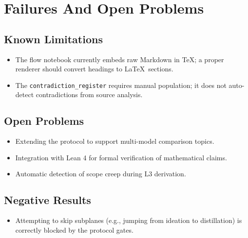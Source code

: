 \documentclass[11pt,a4paper]{article}
\begin{document}
\section{Failures And Open Problems}

\subsection{Known Limitations}
\begin{itemize}
  \item The flow notebook currently embeds raw Markdown in TeX; a
        proper renderer should convert headings to \LaTeX\ sections.
  \item The \texttt{contradiction\_register} requires manual population;
        it does not auto-detect contradictions from source analysis.
\end{itemize}

\subsection{Open Problems}
\begin{itemize}
  \item Extending the protocol to support multi-model comparison topics.
  \item Integration with Lean 4 for formal verification of mathematical claims.
  \item Automatic detection of scope creep during L3 derivation.
\end{itemize}

\subsection{Negative Results}
\begin{itemize}
  \item Attempting to skip subplanes (e.g., jumping from ideation to
        distillation) is correctly blocked by the protocol gates.
\end{itemize}
\end{document}
